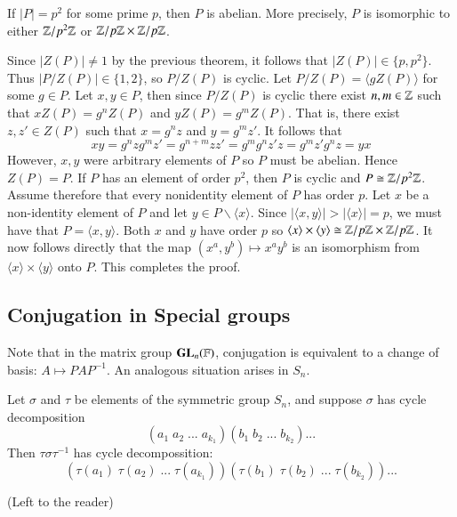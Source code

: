 \documentclass[12pt, a4paper, twoside, openright, titlepage]{book}
\begin{document}
\begin{cor}{}{}
    If $|P| = p^2$ for some prime $p$, then $P$ is abelian. More precisely, $P$ is isomorphic to either $\mathbb Z/p^2\mathbb Z$ or $\mathbb Z/p\mathbb Z\times \mathbb Z/p\mathbb Z$.
\end{cor}
\begin{proof*}{}{}
    Since $|Z(P)| \neq 1$ by the previous theorem, it follows that $|Z(P)| \in \{p,p^2\}$. Thus $|P/Z(P)| \in \{1,2\}$, so $P/Z(P)$ is cyclic. Let $P/Z(P) = \langle gZ(P)\rangle$ for some $g \in P$. Let $x,y \in P$, then since $P/Z(P)$ is cyclic there exist $n,m \in \mathbb Z$ such that $xZ(P) = g^nZ(P)$ and $yZ(P) = g^mZ(P)$. That is, there exist $z,z' \in Z(P)$ such that $x = g^nz$ and $y = g^mz'$. It follows that \begin{equation*}
        xy = g^nzg^mz' = g^{n+m}zz' = g^mg^nz'z = g^mz'g^nz = yx
    \end{equation*}
    However, $x,y$ were arbitrary elements of $P$ so $P$ must be abelian. Hence $Z(P) = P$. If $P$ has an element of order $p^2$, then $P$ is cyclic and $P \cong \mathbb Z/p^2\mathbb Z$. Assume therefore that every nonidentity element of $P$ has order $p$. Let $x$ be a non-identity element of $P$ and let $y \in P\backslash\langle x\rangle$. Since $|\langle x,y \rangle| > |\langle x\rangle|=p$, we must have that $P = \langle x,y\rangle$. Both $x$ and $y$ have order $p$ so $\langle x\rangle\times \langle y\rangle \cong \mathbb Z/p\mathbb Z\times \mathbb Z/p\mathbb Z$. It now follows directly that the map $(x^a,y^b)\mapsto x^ay^b$ is an isomorphism from $\langle x\rangle\times \langle y\rangle$ onto $P$. This completes the proof.
\end{proof*}

\subsection{\textsection Conjugation in Special groups}

\begin{rmk}{}{}
    Note that in the matrix group $\mathbf{GL}_n(\mathbb F)$, conjugation is equivalent to a change of basis: $A \mapsto PAP^{-1}$. An analogous situation arises in $S_n$.
\end{rmk}

\begin{prop}{}{}
    Let $\sigma$ and $\tau$ be elements of the symmetric group $S_n$, and suppose $\sigma$ has cycle decomposition \begin{equation*}
        (a_1\;a_2\;...\;a_{k_1})(b_1\;b_2\;...\;b_{k_2})...
    \end{equation*}
    Then $\tau\sigma\tau^{-1}$ has cycle decompossition: \begin{equation*}
        (\tau(a_1)\;\tau(a_2)\;...\;\tau(a_{k_1}))(\tau(b_1)\;\tau(b_2)\;...\;\tau(b_{k_2}))...
    \end{equation*}
\end{prop}
\begin{proof*}{}{}
    (Left to the reader)
\end{proof*}
\end{document}

